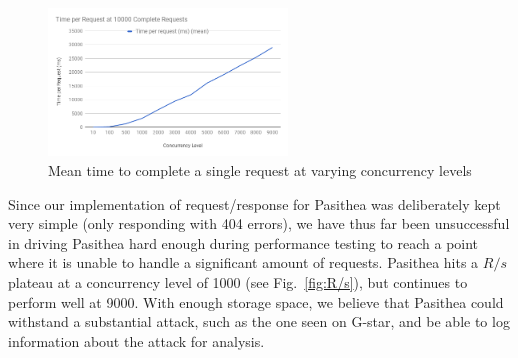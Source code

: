 \begin{figure}[t]
   \centering
   \includegraphics[width=2.5in]{images/TimeperRequest.png} 
   \caption{Mean time to complete a single request at varying concurrency levels}
   \label{fig:T/R}
\end{figure}

Since our implementation of request/response for Pasithea was deliberately kept very simple (only responding with 404 errors), we have thus far been unsuccessful in driving Pasithea hard enough during performance testing to reach a point where it is unable to handle a significant amount of requests.  
Pasithea hits a $R/s$ plateau at a concurrency level of 1000 (see Fig.~\ref{fig:R/s}), but continues to perform well at 9000.
With enough storage space, we believe that Pasithea could withstand a substantial attack, such as the one seen on G-star, and be able to log information about the attack for analysis.
